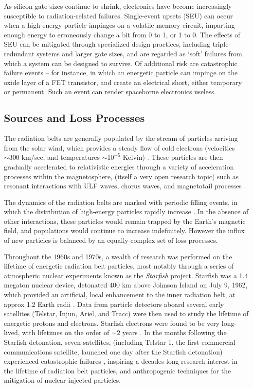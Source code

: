 As silicon gate sizes continue to shrink, electronics have become increasingly susceptible to radiation-related failures. Single-event upsets (SEU) can occur when a high-energy particle impinges on a volatile memory circuit, imparting enough energy to erroneously change a bit from 0 to 1, or 1 to 0. The effects of SEU can be mitigated through specialized design practices, including triple-redundant systems and larger gate sizes, and are regarded as `soft' failures from which a system can be designed to survive. Of additional risk are catastrophic failure events -- for instance, in which an energetic particle can impinge on the oxide layer of a FET transistor, and create an electrical short, either temporary or permanent. Such an event can render spaceborne electronics useless.

\subsection{Sources and Loss Processes}
The radiation belts are generally populated by the stream of particles arriving from the solar wind, which provides a steady flow of cold electrons (velocities $\sim 300$ km/sec, and temperatures $\sim 10^{-5}$ Kelvin) \citep{Montgomery1974, Tascione1988}. These particles are then gradually accelerated to relativistic energies through a variety of acceleration processes within the magnetosphere, (itself a very open research topic) such as resonant interactions with ULF waves, chorus waves, and magnetotail processes \citep{Shprits2006,  Bortnik2007a, Thorne2013}.

The dynamics of the radiation belts are marked with periodic filling events, in which the distribution of high-energy particles rapidly increase \cite{Baker2014}. In the absence of other interactions, these particles would remain trapped by the Earth's magnetic field, and populations would continue to increase indefinitely. However the influx of new particles is balanced by an equally-complex set of loss processes.

Throughout the 1960s and 1970s, a wealth of research was performed on the lifetime of energetic radiation belt particles, most notably through a series of atmospheric nuclear experiments known as the \emph{Starfish} project\footnotemark. Starfish was a 1.4 megaton nuclear device, detonated 400 km above Johnson Island on July 9, 1962, which provided an artificial, local enhancement to the inner radiation belt, at approx 1.2 Earth radii \citep{Hess1963}. Data from particle detectors aboard several early satellites (Telstar, Injun, Ariel, and Tracc) were then used to study the lifetime of energetic protons and electrons. Starfish electrons were found to be very long-lived, with lifetimes on the order of $\sim 2$ years \citep{Beall1967}. In the months following the Starfish detonation, seven satellites, (including Telstar 1, the first commercial communications satellite, launched one day after the Starfish detonation) experienced catastrophic failures \citep{Wenaas1978, Barth2003, Conrad2010}, inspiring a decades-long research interest in the lifetime of radiation belt particles, and anthropogenic techniques for the mitigation of nuclear-injected particles.

